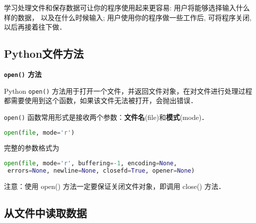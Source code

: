 学习处理文件和保存数据可让你的程序使用起来更容易: 用户将能够选择输入什么样的数据， 以及在什么时候输入; 用户使用你的程序做一些工作后, 可将程序关闭, 以后再接着往下做．
\subsection{Python文件方法}
\textbf{\verb|open()| 方法}

Python \verb|open()| 方法用于打开一个文件，并返回文件对象，在对文件进行处理过程都需要使用到这个函数，如果该文件无法被打开，会抛出错误．


\verb|open()| 函数常用形式是接收两个参数：\textbf{文件名}(file)和\textbf{模式}(mode)．
\begin{lstlisting}[language=python]
open(file, mode='r')
\end{lstlisting}
完整的参数格式为
\begin{lstlisting}[language=python]
open(file, mode='r', buffering=-1, encoding=None,
 errors=None, newline=None, closefd=True, opener=None)
\end{lstlisting}
注意：使用 open() 方法一定要保证关闭文件对象，即调用 close() 方法．
\subsection{从文件中读取数据}
